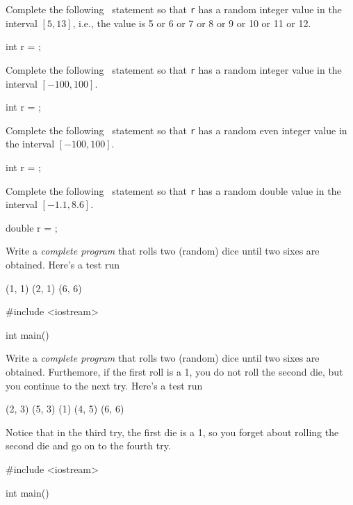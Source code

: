 

\nextq
Complete the following \cpp\ statement so that \verb!r! has a random integer
value in the interval $[5, 13]$,
i.e., the value is 5 or 6 or 7 or 8 or 9 or 10 or 11 or 12.
\\
\ANSWER
\begin{answercode}
int r =                    ;
\end{answercode}

\nextq
Complete the following \cpp\ statement so that \verb!r! has a random integer value
in the interval $[-100, 100]$.
\\
\ANSWER
\begin{answercode}
int r =                    ;
\end{answercode}

\nextq
Complete the following \cpp\ statement
so that \verb!r! has a random even integer value
in the interval $[-100, 100]$.
\\
\ANSWER
\begin{answercode}
int r =                    ;
\end{answercode}

\nextq
Complete the following \cpp\ statement so that \verb!r! has a random double value
in the interval $[-1.1, 8.6]$.
\\
\ANSWER
\begin{answercode}
double r =                    ;
\end{answercode}

\nextq
Write a \textit{complete program} that rolls two (random) dice until two
sixes are obtained.
Here's a test run
\begin{console}[fontsize=\footnotesize]
(1, 1) (2, 1) (6, 6)
\end{console}
\ANSWER
\begin{answercode}
#include <iostream>

int main()
{
}
\end{answercode}

\nextq
Write a \textit{complete program} that rolls two (random) dice until two
sixes are obtained.
Furthemore, if the first roll is a 1, you do not roll the second die,
but you continue to the next try.
Here's a test run
\begin{console}[fontsize=\footnotesize]
(2, 3) (5, 3) (1) (4, 5) (6, 6)
\end{console}
Notice that in the third try, the first die is a 1, so you forget
about rolling the second die and go on to the fourth try.
\\
\ANSWER
\begin{answercode}
#include <iostream>

int main()
{
}
\end{answercode}

